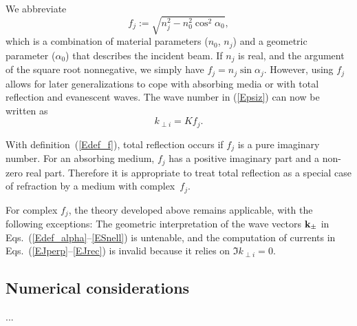 We abbreviate
\begin{equation}\label{Edef_f}
f_j := \sqrt{ n_j^2 - n_0^2 \cos^2\alpha_0 },
\end{equation}
which is a combination of material parameters ($n_0$, $n_j$)
and a geometric parameter ($\alpha_0$) that describes the incident beam.
If $n_j$ is real, and the argument of the square root nonnegative,
we simply have $f_j=n_j\sin\alpha_j$.
However, using $f_j$ allows for later generalizations
to cope with absorbing media or with total reflection and evanescent waves.
The wave number in (\ref{Epsiz}) can now be written as
\begin{equation}\label{EkKf}
  k_{\perp i} = K f_j.
\end{equation}

With definition~(\ref{Edef_f}),
total reflection occurs if $f_j$ is a pure imaginary number.
For an absorbing medium, $f_j$ has a positive imaginary part
and a non-zero real part.
Therefore it is appropriate to treat total reflection as a special
case of refraction by a medium with complex~$f_j$.

For complex $f_j$,
the theory developed above
remains applicable, with the following exceptions:
The geometric interpretation of the wave vectors $\mathbf{k}_\pm$
in Eqs.~(\ref{Edef_alpha}--\ref{ESnell}) is untenable,
and the computation of currents in
Eqs.~(\ref{EJperp}--\ref{EJrec}) is invalid because it
relies on $\Im k_{\perp i}=0$.


\subsection{Numerical considerations}

...

